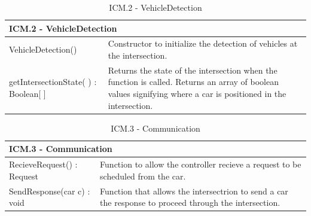 \documentclass [10pt]{article}
\begin{document}
\begin{longtable}{| p{ } | p{ } | }\caption{ICM.2 - VehicleDetection} \\\hline  
 \multicolumn{2}{|l|}{\textbf {ICM.2 - VehicleDetection}}\\ \hline
 
\cellcolor{tableCell}VehicleDetection()& \cellcolor{tableCell}Constructor to initialize the detection of vehicles at the intersection. \\ \hline 

getIntersectionState( ) : Boolean[ ] & Returns the state of the intersection when the function is called. Returns an array of boolean values signifying where a car is positioned in the intersection. \\ \hline 



\end{longtable}

\begin{longtable}{| p{ } | p{ } | }\caption{ICM.3 - Communication} \\\hline  
 \multicolumn{2}{|l|}{\textbf {ICM.3 - Communication}}\\ \hline
 
\cellcolor{tableCell}RecieveRequest() : Request& \cellcolor{tableCell}Function to allow the controller recieve a request to be scheduled from the car.\\ \hline 


SendResponse(car c) : void & Function that allows the intersectrion to send a car the response to proceed through the intersection. \\ \hline




\end{longtable}
\end{document}
